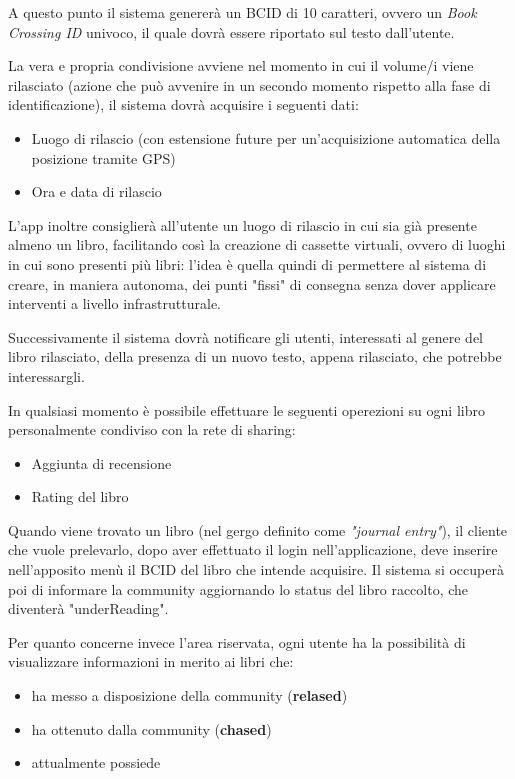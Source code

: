 A questo punto il sistema genererà un BCID di 10 caratteri, ovvero un \textit{Book Crossing ID} univoco, il
quale dovrà essere riportato sul testo dall'utente.


La vera e propria condivisione avviene nel momento in cui il volume/i viene rilasciato (azione che può avvenire in un secondo momento
rispetto alla fase di identificazione), il sistema dovrà acquisire i seguenti dati:
\begin{itemize}
	\item Luogo di rilascio (con estensione future per un'acquisizione automatica della posizione tramite GPS)
	\item Ora e data di rilascio 
\end{itemize}

L'app inoltre consiglierà all'utente un luogo di rilascio in cui sia già presente almeno un libro, 
facilitando così la creazione di cassette virtuali, ovvero di luoghi in cui sono presenti più libri: 
l'idea è quella quindi di permettere al sistema di creare, in maniera autonoma, dei punti "fissi" di 
consegna senza dover applicare interventi a livello infrastrutturale.

Successivamente il sistema dovrà notificare gli utenti, interessati al genere del 
libro rilasciato, della presenza di un nuovo testo, appena rilasciato, che potrebbe interessargli.

In qualsiasi momento è possibile effettuare le seguenti operezioni su ogni libro personalmente 
condiviso con la rete di sharing:
\begin{itemize}
	\item Aggiunta di recensione
	\item Rating del libro
\end{itemize}

Quando viene trovato un libro (nel gergo definito come \textit{"journal entry"}), il cliente che vuole prelevarlo, dopo
aver effettuato il login nell'applicazione, deve inserire nell'apposito menù il BCID del libro che intende acquisire.
Il sistema si occuperà poi di informare la community aggiornando lo status del libro raccolto, che diventerà "underReading".

Per quanto concerne invece l'area riservata, ogni utente ha la possibilità di 
visualizzare informazioni in merito ai libri che: 
\begin{itemize}
	\item ha messo a disposizione della community (\textbf{relased})
	\item ha ottenuto dalla community (\textbf{chased})
	\item attualmente possiede
\end{itemize}

